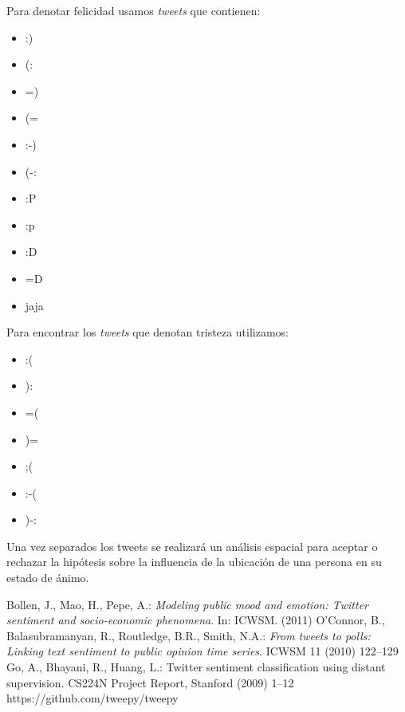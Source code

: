 \documentclass{article}
\begin{document}
	    \noindent Para denotar felicidad usamos \emph{tweets} que contienen:
	\begin{multicols}{3}
	\begin{itemize}
        \item :)
        \item (:
        \item =) 
        \item (=
        \item :-)
        \item (-:
        \item :P
        \item :p
        \item :D
        \item =D
        \item jaja
    \end{itemize}
    \end{multicols}
    

        \noindent Para encontrar los \emph{tweets} que denotan tristeza utilizamos:
    \begin{multicols}{3}
	\begin{itemize}
        \item :(
        \item ):
        \item =( 
        \item )=
        \item ;(
        \item :-(
        \item )-:
    \end{itemize}
    \end{multicols}
    
    Una vez separados los tweets se realizará un análisis espacial para aceptar o rechazar la hipótesis sobre la influencia de la ubicación de una persona en su estado de ánimo.


    \begin{thebibliography}{9}
    Bollen, J., Mao, H., Pepe, A.: \emph{Modeling public mood and emotion: Twitter sentiment and socio-economic phenomena}. In: ICWSM. (2011)
    O’Connor, B., Balasubramanyan, R., Routledge, B.R., Smith, N.A.: \emph{From tweets to polls: Linking text sentiment to public opinion time series}. ICWSM 11 (2010) 122–129
    Go, A., Bhayani, R., Huang, L.: Twitter sentiment classification using distant supervision. CS224N Project Report, Stanford (2009) 1–12
        https://github.com/tweepy/tweepy
    \end{thebibliography}
\end{document}
